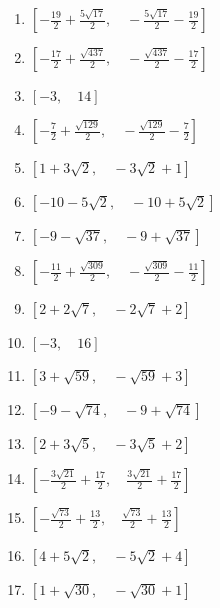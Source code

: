 \documentclass[9pt,dvipdfmx,a4paper]{article}
\begin{document}
\begin{multicols}{2}
\begin{enumerate}
\item
$ \left [ - \frac{19}{2} + \frac{5 \sqrt{17}}{2}, \quad - \frac{5 \sqrt{17}}{2} - \frac{19}{2}\right ]$

\item
$ \left [ - \frac{17}{2} + \frac{\sqrt{437}}{2}, \quad - \frac{\sqrt{437}}{2} - \frac{17}{2}\right ]$

\item
$ \left [ -3, \quad 14\right ]$

\item
$ \left [ - \frac{7}{2} + \frac{\sqrt{129}}{2}, \quad - \frac{\sqrt{129}}{2} - \frac{7}{2}\right ]$

\item
$ \left [ 1 + 3 \sqrt{2}, \quad - 3 \sqrt{2} + 1\right ]$

\item
$ \left [ -10 - 5 \sqrt{2}, \quad -10 + 5 \sqrt{2}\right ]$

\item
$ \left [ -9 - \sqrt{37}, \quad -9 + \sqrt{37}\right ]$

\item
$ \left [ - \frac{11}{2} + \frac{\sqrt{309}}{2}, \quad - \frac{\sqrt{309}}{2} - \frac{11}{2}\right ]$

\item
$ \left [ 2 + 2 \sqrt{7}, \quad - 2 \sqrt{7} + 2\right ]$

\item
$ \left [ -3, \quad 16\right ]$

\item
$ \left [ 3 + \sqrt{59}, \quad - \sqrt{59} + 3\right ]$

\item
$ \left [ -9 - \sqrt{74}, \quad -9 + \sqrt{74}\right ]$

\item
$ \left [ 2 + 3 \sqrt{5}, \quad - 3 \sqrt{5} + 2\right ]$

\item
$ \left [ - \frac{3 \sqrt{21}}{2} + \frac{17}{2}, \quad \frac{3 \sqrt{21}}{2} + \frac{17}{2}\right ]$

\item
$ \left [ - \frac{\sqrt{73}}{2} + \frac{13}{2}, \quad \frac{\sqrt{73}}{2} + \frac{13}{2}\right ]$

\item
$ \left [ 4 + 5 \sqrt{2}, \quad - 5 \sqrt{2} + 4\right ]$

\item
$ \left [ 1 + \sqrt{30}, \quad - \sqrt{30} + 1\right ]$


\end{enumerate}
\end{multicols}
\end{document}
